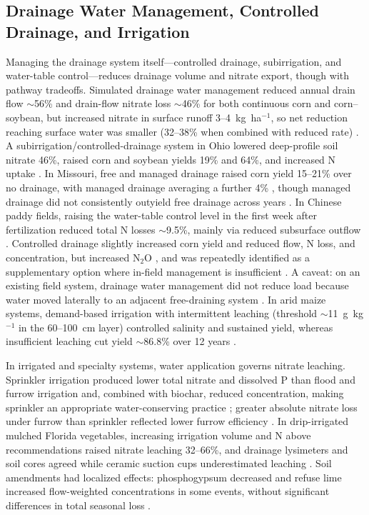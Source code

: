 \subsection{Drainage Water Management, Controlled Drainage, and Irrigation}

Managing the drainage system itself---controlled drainage, subirrigation, and water-table control---reduces drainage volume and nitrate export, though with pathway tradeoffs. Simulated drainage water management reduced annual drain flow $\sim$56\% and drain-flow nitrate loss $\sim$46\% for both continuous corn and corn--soybean, but increased nitrate in surface runoff 3--4~kg~ha$^{-1}$, so net reduction reaching surface water was smaller (32--38\% when combined with reduced rate) \parencite{Ale2012b}. A subirrigation/controlled-drainage system in Ohio lowered deep-profile soil nitrate 46\%, raised corn and soybean yields 19\% and 64\%, and increased N uptake \parencite{Fisher1999}. In Missouri, free and managed drainage raised corn yield 15--21\% over no drainage, with managed drainage averaging a further 4\% \parencite{Nash2015}, though managed drainage did not consistently outyield free drainage across years \parencite{Nash2015b}. In Chinese paddy fields, raising the water-table control level in the first week after fertilization reduced total N losses $\sim$9.5\%, mainly via reduced subsurface outflow \parencite{He2019b}. Controlled drainage slightly increased corn yield and reduced flow, N loss, and concentration, but increased N$_2$O \parencite{Wang2016b}, and was repeatedly identified as a supplementary option where in-field management is insufficient \parencite{HernandezRamirez2011}. A caveat: on an existing field system, drainage water management did not reduce load because water moved laterally to an adjacent free-draining system \parencite{David2015}. In arid maize systems, demand-based irrigation with intermittent leaching (threshold $\sim$11~g~kg$^{-1}$ in the 60--100~cm layer) controlled salinity and sustained yield, whereas insufficient leaching cut yield $\sim$86.8\% over 12 years \parencite{Liu2024}.

In irrigated and specialty systems, water application governs nitrate leaching. Sprinkler irrigation produced lower total nitrate and dissolved P than flood and furrow irrigation and, combined with biochar, reduced concentration, making sprinkler an appropriate water-conserving practice \parencite{Farahani2020}; greater absolute nitrate loss under furrow than sprinkler reflected lower furrow efficiency \parencite{Hurtado2011}. In drip-irrigated mulched Florida vegetables, increasing irrigation volume and N above recommendations raised nitrate leaching 32--66\%, and drainage lysimeters and soil cores agreed while ceramic suction cups underestimated leaching \parencite{Zotarelli2007}. Soil amendments had localized effects: phosphogypsum decreased and refuse lime increased flow-weighted concentrations in some events, without significant differences in total seasonal loss \parencite{Hurtado2011}.

